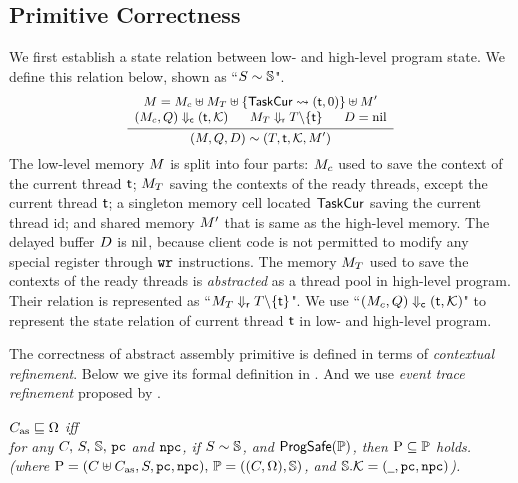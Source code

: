 % 
\subsection{Primitive Correctness}
\label{subsec:correctness-primitive}

We first establish a state relation 
between low- and high-level program state. 
We define this relation below, shown as 
``${S} \sim {\mathbb{S}}$". 
\[
    \small
    \infer
    {
        \stateRel{(\Mem, \Rstate, \DBuf)}
            {(\thrdpool, \thrdid, \hthrdlocalst, \Mem')}
    }
    {
        \begin{array}{c}
            \Mem = \Mem_c \uplus \Mem_T \uplus 
                \{ \TaskCur \rightsquigarrow (\thrdid, 0) \}
                \uplus \Mem' \\
            \curStRel{(\Mem_c, \Rstate)}{(\thrdid, \hthrdlocalst)}
            \quad \ \ 
            \rdyStRel{\Mem_T}{\thrdpool \backslash \{ \thrdid \}}
            \quad \ \ 
            \DBuf = \nil
        \end{array}
    }
\]
The low-level memory $M$ is split into four parts: 
$M_c$ used to save the context of the current thread $\textsf{t}$; 
$M_T$ saving the contexts of the ready threads, 
except the current thread $\textsf{t}$; a singleton memory 
cell located $\mathsf{TaskCur}$ saving the current thread id; and shared 
memory $M'$ that is same as the high-level memory. 
The delayed buffer $D$ is $\text{nil}$, because client 
code is not permitted to modify any special register 
through $\texttt{wr}{}$ instructions. The memory $M_T$ used to 
save the contexts of the ready threads is {\it abstracted} as a thread pool 
in high-level program. Their relation is represented as 
``${M_T} \Downarrow_{\textsf{r}} {T \backslash \{ \textsf{t} \}}$".  
We use ``${(M_c, Q)} \Downarrow_{\textsf{c}} {(\textsf{t}, \mathcal{K})}$" 
to represent the state relation of current thread $\textsf{t}$ 
in low- and high-level program. 

The correctness of abstract assembly primitive 
is defined in terms of {\it contextual refinement}.  
Below we give its formal definition in 
\Def{\ref{def:prim-correctness}}.  
And we use {\it event trace refinement} 
proposed by \etal{Liang} \cite{liang14lics}.

\begin{definition}
    \em
    \label{def:prim-correctness}
    $C_{\text{as}} \sqsubseteq \Omega$ iff  \\
    for any $C, \, S, \, \mathbb{S}, \, \texttt{pc}$ and $\texttt{npc}$, if 
    ${S} \sim {\mathbb{S}}$, and $\textsf{ProgSafe}(\mathbb{P})$, 
    then $\text{P} \subseteq \mathbb{P}$ holds. 
    (where $\text{P} = (C \uplus C_{\text{as}}, S, \texttt{pc}, \texttt{npc}), \, 
        \mathbb{P} = ((C, \Omega), \mathbb{S})$, and 
        $\mathbb{S}.\mathcal{K} = (\underline{\ \,}, \texttt{pc}, \texttt{npc})$).  
\end{definition}

